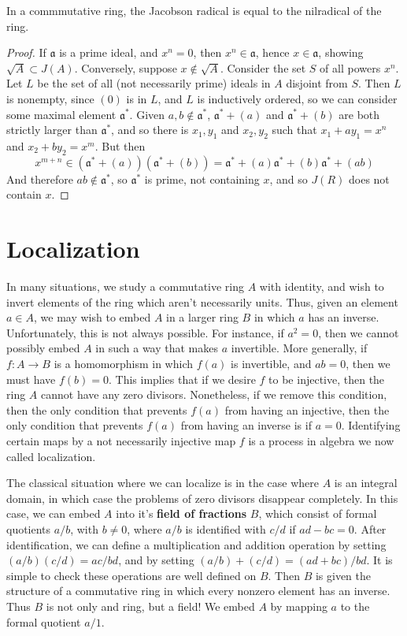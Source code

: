 \begin{theorem}
    In a commmutative ring, the Jacobson radical is equal to the nilradical of the ring.
\end{theorem}
\begin{proof}
    If $\mathfrak{a}$ is a prime ideal, and $x^n = 0$, then $x^n \in \mathfrak{a}$, hence $x \in \mathfrak{a}$, showing $\sqrt{A} \subset J(A)$. Conversely, suppose $x \not \in \sqrt{A}$. Consider the set $S$ of all powers $x^n$. Let $L$ be the set of all (not necessarily prime) ideals in $A$ disjoint from $S$. Then $L$ is nonempty, since $(0)$ is in $L$, and $L$ is inductively ordered, so we can consider some maximal element $\mathfrak{a}^*$. Given $a,b \not \in \mathfrak{a}^*$, $\mathfrak{a}^* + (a)$ and $\mathfrak{a}^* + (b)$ are both strictly larger than $\mathfrak{a}^*$, and so there is $x_1,y_1$ and $x_2,y_2$ such that $x_1 + ay_1 = x^n$ and $x_2 + by_2 = x^m$. But then
    \[ x^{m+n} \in (\mathfrak{a}^* + (a))(\mathfrak{a}^* + (b)) = \mathfrak{a}^* + (a) \mathfrak{a}^* + (b) \mathfrak{a}^* + (ab) \]
    And therefore $ab \not \in \mathfrak{a}^*$, so $\mathfrak{a}^*$ is prime, not containing $x$, and so $J(R)$ does not contain $x$.
\end{proof}

\section{Localization}

In many situations, we study a commutative ring $A$ with identity, and wish to invert elements of the ring which aren't necessarily units. Thus, given an element $a \in A$, we may wish to embed $A$ in a larger ring $B$ in which $a$ has an inverse. Unfortunately, this is not always possible. For instance, if $a^2 = 0$, then we cannot possibly embed $A$ in such a way that makes $a$ invertible. More generally, if $f:A \to B$ is a homomorphism in which $f(a)$ is invertible, and $ab = 0$, then we must have $f(b) = 0$. This implies that if we desire $f$ to be injective, then the ring $A$ cannot have any zero divisors. Nonetheless, if we remove this condition, then the only condition that prevents $f(a)$ from having an injective, then the only condition that prevents $f(a)$ from having an inverse is if $a = 0$. Identifying certain maps by a not necessarily injective map $f$ is a process in algebra we now called localization.

The classical situation where we can localize is in the case where $A$ is an integral domain, in which case the problems of zero divisors disappear completely. In this case, we can embed $A$ into it's {\bf field of fractions} $B$, which consist of formal quotients $a/b$, with $b \neq 0$, where $a/b$ is identified with $c/d$ if $ad - bc = 0$. After identification, we can define a multiplication and addition operation by setting $(a/b)(c/d) = ac/bd$, and by setting $(a/b) + (c/d) = (ad + bc)/bd$. It is simple to check these operations are well defined on $B$. Then $B$ is given the structure of a commutative ring in which every nonzero element has an inverse. Thus $B$ is not only and ring, but a field! We embed $A$ by mapping $a$ to the formal quotient $a/1$.

